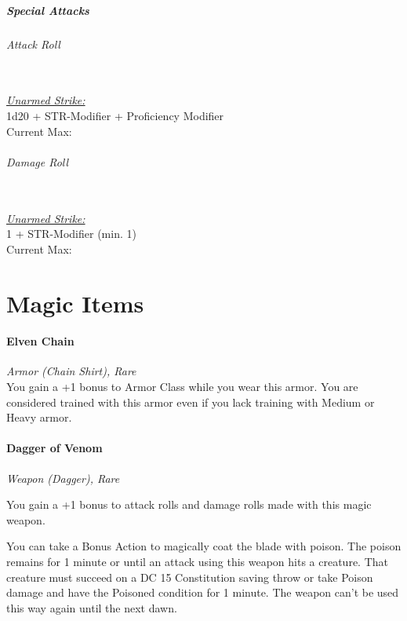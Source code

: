 \documentclass[letterpaper,openany,oneside,twocolumn]{book}
\begin{document}
\subsubsection*{Special Attacks}
\paragraph*{Attack Roll}\hfill\\
\underline{\textit{Unarmed Strike:}}\\
1d20 + STR-Modifier + Proficiency Modifier\\
\indent Current Max: 
\paragraph*{Damage Roll}\hfill\\
\underline{\textit{Unarmed Strike:}}\\
1 + STR-Modifier (min. 1)\\
\indent Current Max: 

\part*{Magic Items}
\subsection*{Elven Chain}
\textit{Armor (Chain Shirt), Rare}\\
{\entryfont You gain a +1 bonus to Armor Class while you wear this armor. You are considered trained with this armor even if you lack training with Medium or Heavy armor.}

\subsection*{Dagger of Venom}
\textit{Weapon (Dagger), Rare}\\
{\entryfont You gain a +1 bonus to attack rolls and damage rolls made with this magic weapon.

You can take a Bonus Action to magically coat the blade with poison. The poison remains for 1 minute or until an attack using this weapon hits a creature. That creature must succeed on a DC 15 Constitution saving throw or take  Poison damage and have the Poisoned condition for 1 minute. The weapon can't be used this way again until the next dawn.}
\end{document}
